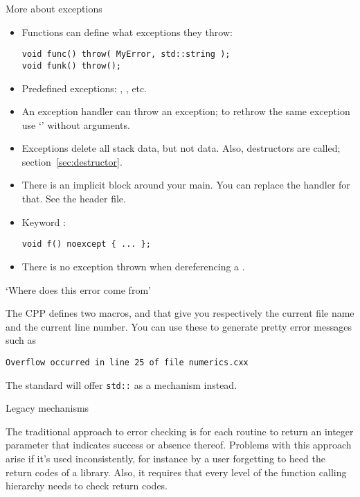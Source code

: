 \begin{block}{More about exceptions}
  \label{sl:exception-more}
  \begin{itemize}
  \item Functions can define what exceptions they throw: 
\begin{lstlisting}
void func() throw( MyError, std::string );
void funk() throw();
\end{lstlisting}
\item Predefined exceptions: ,
  , etc.
\item An exception handler can throw an exception; to rethrow the same
  exception use `' without arguments.
\item Exceptions delete all stack data, but not  data. Also,
  destructors are called; section~\ref{sec:destructor}.
\item There is an implicit  block around your
  main. You can replace the handler for that. See the
   header file.
\item Keyword :
\begin{lstlisting}
void f() noexcept { ... };
\end{lstlisting}
\item There is no exception thrown when dereferencing a .
  \end{itemize}
\end{block}

 {`Where does this error come from'}

The \ac{CPP} defines two macros,  and
 that give you respectively the current file name
and the current line number. You can use these to generate pretty
error messages such as
\begin{verbatim}
Overflow occurred in line 25 of file numerics.cxx
\end{verbatim}

The  standard will offer
\texttt{std::} as a mechanism instead.

 {Legacy mechanisms}

The traditional approach to error checking is for each routine to
return an integer parameter that indicates success or absence
thereof. 
Problems with this approach arise if it's used inconsistently, for
instance by a user forgetting to heed the return codes of a library.
Also, it requires that every level of the function calling hierarchy
needs to check return codes.

